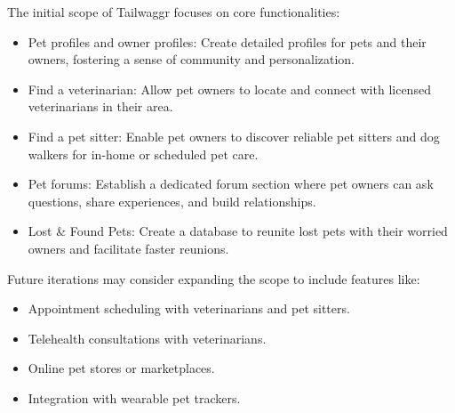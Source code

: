 \documentclass{article}
\begin{document}
The initial scope of Tailwaggr focuses on core functionalities:

\begin{itemize}
\item Pet profiles and owner profiles: Create detailed profiles for pets and their owners, fostering a sense of community and personalization.
\item Find a veterinarian: Allow pet owners to locate and connect with licensed veterinarians in their area.
\item Find a pet sitter: Enable pet owners to discover reliable pet sitters and dog walkers for in-home or scheduled pet care.
\item Pet forums: Establish a dedicated forum section where pet owners can ask questions, share experiences, and build relationships.
\item Lost \& Found Pets: Create a database to reunite lost pets with their worried owners and facilitate faster reunions.
\end{itemize}

Future iterations may consider expanding the scope to include features like:

\begin{itemize}
\item Appointment scheduling with veterinarians and pet sitters.
\item Telehealth consultations with veterinarians.
\item Online pet stores or marketplaces.
\item Integration with wearable pet trackers.
\end{itemize}
\end{document}
